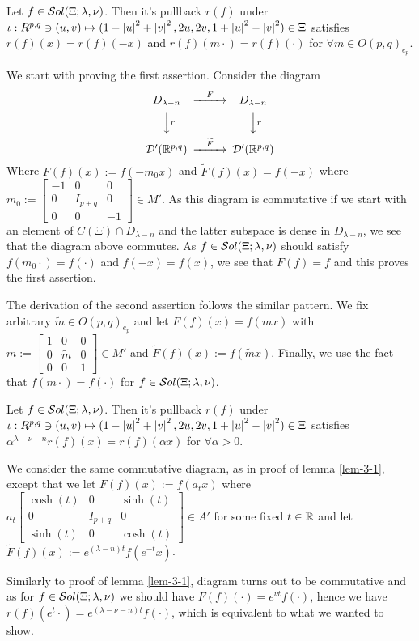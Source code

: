 \documentclass[10pt]{article} %
\newcommand{\D}{\mathcal{D}}
\theoremstyle{definition}
\theoremstyle{remark}
\begin{document}
\begin{mylem}\label{lem-3-1}
	Let $f\in \mathcal{S}ol(\Xi;\lambda,\nu)$. Then it's pullback $r(f)$ under $\iota:R^{p,q}\ni(u,v)\mapsto
	(1-\left| u \right|^2+\left| v \right|^2,2u,2v,1+\left| u \right|^2-\left| v \right|^2)\in\Xi$ satisfies $r(f)(x)=r(f)(-x)$
	and $r(f)(m\cdot)=r(f)(\cdot)$ for $\forall m\in O(p,q)_{e_p}$.
\end{mylem}
\begin{myproof}
	We start with proving the first assertion. Consider the diagram
\[\begin{CD}
		D_{\lambda-n}     @>F>>  D_{\lambda-n}\\
@VVrV        @VVrV\\
\D'(\R^{p,q})     @>\widetilde{F}>>  \D'(\R^{p,q})
\end{CD}\]
Where $F(f)(x):=f(-m_0x)$ and $\widetilde{F}(f)(x)=f(-x)$ where $m_0:=
\begin{bmatrix}-1&0&0\\0&I_{p+q}&0\\0&0&-1\end{bmatrix}\in M'$.
As this diagram is commutative if we start with an element of $C(\Xi)\cap D_{\lambda-n}$ and the latter subspace
is dense in $D_{\lambda-n}$, we see that the diagram above commutes. As $f\in\mathcal{S}ol(\Xi;\lambda,\nu)$ should satisfy $f(m_0\cdot)=f(\cdot)$ and
$f(-x)=f(x)$, we see that $F(f)=f$ and this proves the first assertion.

The derivation of the
second assertion follows the similar pattern. We fix arbitrary $\widetilde{m}\in O(p,q)_{e_p}$ and let $F(f)(x)=f(m x)$ with 
$m:=\begin{bmatrix}1&0&0\\0&\widetilde{m}&0\\0&0&1\end{bmatrix}\in M'$ and $\widetilde{F}(f)(x):=f(\widetilde{m} x)$. Finally,
we use the fact that $f(m\cdot)=f(\cdot)$ for $f\in\mathcal{S}ol(\Xi;\lambda,\nu)$.
\end{myproof}
\begin{mylem}\label{lem-3-2}
	Let $f\in \mathcal{S}ol(\Xi;\lambda,\nu)$. Then it's pullback $r(f)$ under $\iota:R^{p,q}\ni(u,v)\mapsto
	(1-\left| u \right|^2+\left| v \right|^2,2u,2v,1+\left| u \right|^2-\left| v \right|^2)\in\Xi$ satisfies 
	$\alpha^{\lambda-\nu-n}r(f)(x)=r(f)(\alpha x)$ for $\forall\alpha>0$.
\end{mylem}
\begin{myproof}
	We consider the same commutative diagram, as in proof of lemma \ref{lem-3-1}, except that we let $F(f)(x):=f(a_tx)$
	where $a_t
	\begin{bmatrix}
		\cosh(t)&0&\sinh(t)\\0&I_{ p+q }&0\\\sinh(t)&0&\cosh(t)
	\end{bmatrix}\in A'$ for some fixed $t\in\mathbb{R}$ and let $\widetilde{F}(f)(x):=e^{(\lambda-n)t}f(e^{-t}x)$.

	Similarly to proof of lemma \ref{lem-3-1}, diagram turns out to be commutative and as for $f\in\mathcal{S}ol(\Xi;\lambda,\nu)$ we should have
	$F(f)(\cdot)=e^{\nu t}f(\cdot)$, hence we have $r(f)(e^t\cdot)=e^{(\lambda-\nu-n)t}f(\cdot)$, which is equivalent to what
	we wanted to show.
\end{myproof}
\end{document}
